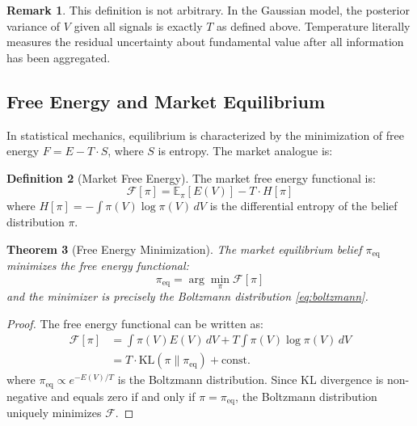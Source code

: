\documentclass[12pt,a4paper]{article}
\newtheorem{theorem}{Theorem}[section]
\theoremstyle{definition}
\newtheorem{definition}[theorem]{Definition}
\newtheorem{remark}[theorem]{Remark}
\newcommand{\E}{\mathbb{E}}
\newcommand{\KL}{\mathrm{KL}}
\begin{document}
\begin{remark}
This definition is not arbitrary. In the Gaussian model, the posterior variance of $V$ given all signals is exactly $T$ as defined above. Temperature literally measures the residual uncertainty about fundamental value after all information has been aggregated.
\end{remark}

\subsection{Free Energy and Market Equilibrium}

In statistical mechanics, equilibrium is characterized by the minimization of free energy $F = E - T \cdot S$, where $S$ is entropy. The market analogue is:

\begin{definition}[Market Free Energy]\label{def:free_energy}
The market free energy functional is:
\begin{equation}\label{eq:free_energy}
    \mathcal{F}[\pi] = \E_\pi[E(V)] - T \cdot H[\pi]
\end{equation}
where $H[\pi] = -\int \pi(V) \log \pi(V) \, dV$ is the differential entropy of the belief distribution $\pi$.
\end{definition}

\begin{theorem}[Free Energy Minimization]\label{thm:free_energy_min}
The market equilibrium belief $\pi_{\text{eq}}$ minimizes the free energy functional:
\begin{equation}
    \pi_{\text{eq}} = \arg\min_{\pi} \mathcal{F}[\pi]
\end{equation}
and the minimizer is precisely the Boltzmann distribution \eqref{eq:boltzmann}.
\end{theorem}

\begin{proof}
The free energy functional can be written as:
\begin{align}
    \mathcal{F}[\pi] &= \int \pi(V) E(V) \, dV + T \int \pi(V) \log \pi(V) \, dV \\
    &= T \cdot \KL(\pi \| \pi_{\text{eq}}) + \text{const.}
\end{align}
where $\pi_{\text{eq}} \propto e^{-E(V)/T}$ is the Boltzmann distribution. Since KL divergence is non-negative and equals zero if and only if $\pi = \pi_{\text{eq}}$, the Boltzmann distribution uniquely minimizes $\mathcal{F}$.
\end{proof}
\end{document}
